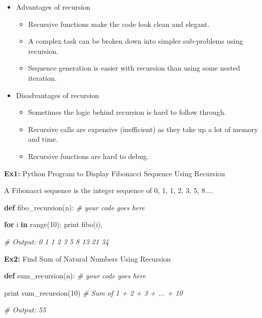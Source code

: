 \documentclass[11pt]{article}
\providecommand{\tightlist}{%
      \setlength{\itemsep}{0pt}\setlength{\parskip}{0pt}}
\newenvironment{Shaded}{}{}
\newcommand{\KeywordTok}[1]{\textcolor[rgb]{0.00,0.44,0.13}{\textbf{{#1}}}}
\newcommand{\DecValTok}[1]{\textcolor[rgb]{0.25,0.63,0.44}{{#1}}}
\newcommand{\CommentTok}[1]{\textcolor[rgb]{0.38,0.63,0.69}{\textit{{#1}}}}
\newcommand{\NormalTok}[1]{{#1}}
\newcommand{\ControlFlowTok}[1]{\textcolor[rgb]{0.00,0.44,0.13}{\textbf{{#1}}}}
\newcommand{\BuiltInTok}[1]{{#1}}
\begin{document}
\begin{itemize}
\tightlist
\item
  Advantages of recursion

  \begin{itemize}
  \tightlist
  \item
    Recursive functions make the code look clean and elegant.
  \item
    A complex task can be broken down into simpler sub-problems using
    recursion.
  \item
    Sequence generation is easier with recursion than using some nested
    iteration.
  \end{itemize}
\item
  Disadvantages of recursion

  \begin{itemize}
  \tightlist
  \item
    Sometimes the logic behind recursion is hard to follow through.
  \item
    Recursive calls are expensive (inefficient) as they take up a lot of
    memory and time.
  \item
    Recursive functions are hard to debug.
  \end{itemize}
\end{itemize}

    \textbf{Ex1:} Python Program to Display Fibonacci Sequence Using
Recursion

A Fibonacci sequence is the integer sequence of 0, 1, 1, 2, 3, 5, 8....

\begin{Shaded}
\begin{Highlighting}[]
\KeywordTok{def}\NormalTok{ fibo_recursion(n):}
    \CommentTok{# your code goes here}

\ControlFlowTok{for}\NormalTok{ i }\KeywordTok{in} \BuiltInTok{range}\NormalTok{(}\DecValTok{10}\NormalTok{):}
    \BuiltInTok{print}\NormalTok{ fibo(i), }

\CommentTok{# Output: 0 1 1 2 3 5 8 13 21 34}
\end{Highlighting}
\end{Shaded}

    \textbf{Ex2:} Find Sum of Natural Numbers Using Recursion

\begin{Shaded}
\begin{Highlighting}[]
\KeywordTok{def}\NormalTok{ sum_recursion(n):}
    \CommentTok{# your code goes here}
    
\BuiltInTok{print}\NormalTok{ sum_recursion(}\DecValTok{10}\NormalTok{) }\CommentTok{# Sum of 1 + 2 + 3 + ... + 10}

\CommentTok{# Output: 55}
\end{Highlighting}
\end{Shaded}
\end{document}
